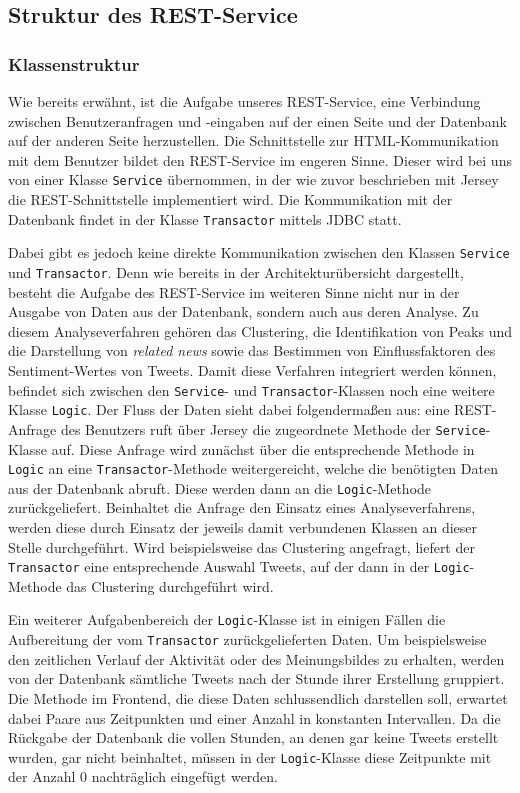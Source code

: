 \subsection{Struktur des REST-Service}

\subsubsection{Klassenstruktur}

Wie bereits erwähnt, ist die Aufgabe unseres REST-Service, eine Verbindung zwischen Benutzeranfragen und -eingaben auf der einen Seite und der Datenbank auf der anderen Seite herzustellen. Die Schnittstelle zur HTML-Kommunikation mit dem Benutzer bildet den REST-Service im engeren Sinne. Dieser wird bei uns von einer Klasse \texttt{Service} übernommen, in der wie zuvor beschrieben mit Jersey die REST-Schnittstelle implementiert wird. Die Kommunikation mit der Datenbank findet in der Klasse \texttt{Transactor} mittels JDBC statt.

Dabei gibt es jedoch keine direkte Kommunikation zwischen den Klassen \texttt{Service} und \texttt{Transactor}. Denn wie bereits in der Architekturübersicht dargestellt, besteht die Aufgabe des REST-Service im weiteren Sinne nicht nur in der Ausgabe von Daten aus der Datenbank, sondern auch aus deren Analyse. Zu diesem Analyseverfahren gehören das Clustering, die Identifikation von Peaks und die Darstellung von \textit{related news} sowie das Bestimmen von Einflussfaktoren des Sentiment-Wertes von Tweets. Damit diese Verfahren integriert werden können, befindet sich zwischen den \texttt{Service}- und \texttt{Transactor}-Klassen noch eine weitere Klasse \texttt{Logic}. Der Fluss der Daten sieht dabei folgendermaßen aus: eine REST-Anfrage des Benutzers ruft über Jersey die zugeordnete Methode der \texttt{Service}-Klasse auf. Diese Anfrage wird zunächst über die entsprechende Methode in \texttt{Logic} an eine \texttt{Transactor}-Methode weitergereicht, welche die benötigten Daten aus der Datenbank abruft. Diese werden dann an die \texttt{Logic}-Methode zurückgeliefert. Beinhaltet die Anfrage den Einsatz eines Analyseverfahrens, werden diese durch Einsatz der jeweils damit verbundenen Klassen an dieser Stelle durchgeführt. Wird beispielsweise das Clustering angefragt, liefert der \texttt{Transactor} eine entsprechende Auswahl Tweets, auf der dann in der \texttt{Logic}-Methode das Clustering durchgeführt wird.

Ein weiterer Aufgabenbereich der \texttt{Logic}-Klasse ist in einigen Fällen die Aufbereitung der vom \texttt{Transactor} zurückgelieferten Daten. Um beispielsweise den zeitlichen Verlauf der Aktivität oder des Meinungsbildes zu erhalten, werden von der Datenbank sämtliche Tweets nach der Stunde ihrer Erstellung gruppiert. Die Methode im Frontend, die diese Daten schlussendlich darstellen soll, erwartet dabei Paare aus Zeitpunkten und einer Anzahl in konstanten Intervallen. Da die Rückgabe der Datenbank die vollen Stunden, an denen gar keine Tweets erstellt wurden, gar nicht beinhaltet, müssen in der \texttt{Logic}-Klasse diese Zeitpunkte mit der Anzahl 0 nachträglich eingefügt werden.

